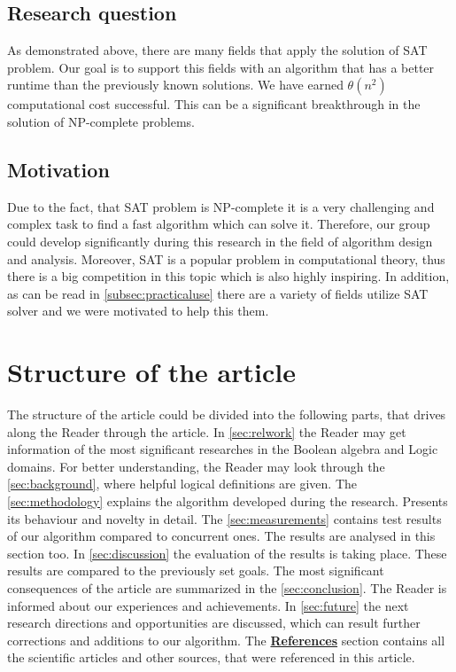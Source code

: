 \documentclass{article}
\begin{document}
\subsection{Research question}
As demonstrated above, there are many fields that apply the solution of SAT problem. Our goal is to support this fields with an algorithm that has a better runtime than the previously known solutions. We have earned $\theta(n^2)$ computational cost successful. This can be a significant breakthrough in the solution of NP-complete problems.

\subsection{Motivation}
Due to the fact, that SAT problem is NP-complete it is a very challenging and complex task to find a fast algorithm which can solve it. Therefore, our group could develop significantly during this research in the field of algorithm design and analysis. Moreover, SAT is a popular problem in computational theory, thus there is a big competition in this topic which is also highly inspiring.
In addition, as can be read in \autoref{subsec:practicaluse} there are a variety of fields utilize SAT solver and we were motivated to help this them. 


\section{Structure of the article}
The structure of the article could be divided into the following parts, that drives along the Reader through the article.
In \autoref{sec:relwork} the Reader may get information of the most significant researches in the Boolean algebra and Logic domains. For better understanding, the Reader may look through the \autoref{sec:background}, where helpful logical definitions are given. The \autoref{sec:methodology} explains the algorithm developed during the research. Presents its behaviour and novelty in detail. The 
\autoref{sec:measurements} contains test results of our algorithm compared to concurrent ones. The results are analysed in this section too. In \autoref{sec:discussion} the evaluation of the results is taking place. These results are compared to the previously set goals. The most significant consequences of the article are summarized in the \autoref{sec:conclusion}. The Reader is informed about our experiences and achievements. In \autoref{sec:future} the next research directions and opportunities are discussed, which can result further corrections and additions to our algorithm. The \hyperref[bib]{\textbf{References}} section contains all the scientific articles and other sources, that were referenced in this article.
\end{document}
